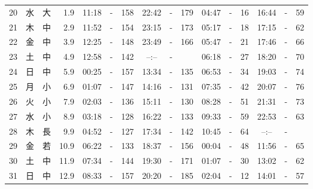 \documentclass[12pt.a4j]{jsarticle}
\begin{document}
\begin{center}
\begin{table}[ht]
\begin{tabular}{|rc|cr|ccrccr|ccrccr|}
20 & 水 & 大 &  1.9 &  11:18 &-& 158  &  22:42 &-& 179  &   04:47 &-&  16  &   16:44 &-&  59  \\
21 & 木 & 中 &  2.9 &  11:52 &-& 154  &  23:15 &-& 173  &   05:17 &-&  18  &   17:15 &-&  62  \\
22 & 金 & 中 &  3.9 &  12:25 &-& 148  &  23:49 &-& 166  &   05:47 &-&  21  &   17:46 &-&  66  \\
23 & 土 & 中 &  4.9 &  12:58 &-& 142  &  --:-- &-&     &   06:18 &-&  27  &   18:20 &-&  70  \\
24 & 日 & 中 &  5.9 &  00:25 &-& 157  &  13:34 &-& 135  &   06:53 &-&  34  &   19:03 &-&  74  \\
25 & 月 & 小 &  6.9 &  01:07 &-& 147  &  14:16 &-& 131  &   07:35 &-&  42  &   20:07 &-&  76  \\
26 & 火 & 小 &  7.9 &  02:03 &-& 136  &  15:11 &-& 130  &   08:28 &-&  51  &   21:31 &-&  73  \\
27 & 水 & 小 &  8.9 &  03:18 &-& 128  &  16:22 &-& 133  &   09:33 &-&  59  &   22:53 &-&  63  \\
28 & 木 & 長 &  9.9 &  04:52 &-& 127  &  17:34 &-& 142  &   10:45 &-&  64  &   --:-- &-&     \\
29 & 金 & 若 & 10.9 &  06:22 &-& 133  &  18:37 &-& 156  &   00:04 &-&  48  &   11:56 &-&  65  \\
30 & 土 & 中 & 11.9 &  07:34 &-& 144  &  19:30 &-& 171  &   01:07 &-&  30  &   13:02 &-&  62  \\
31 & 日 & 中 & 12.9 &  08:33 &-& 157  &  20:20 &-& 185  &   02:04 &-&  12  &   14:01 &-&  57  \\
   \hline
   \end{tabular}
\end{table}
\newpage
\end{center}
\end{document}
